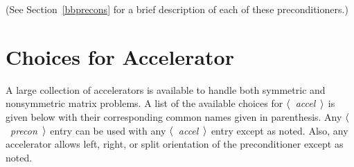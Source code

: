 \bigskip
\noindent
(See Section~\ref{bbprecons} for a brief description of each of
these preconditioners.)
\newpage
\section{Choices for Accelerator}
\label{accels}
\indent
 
   A large collection of accelerators is available to handle both
symmetric and nonsymmetric matrix problems.  A list of the
available choices for $\langle$~{\em accel}~$\rangle$ is given below
with their corresponding common names given in parenthesis.
Any $\langle$~{\em precon}~$\rangle$ entry can be used with any
$\langle$~{\em accel}~$\rangle$ entry except as noted.  Also, any
accelerator allows left, right, or split orientation of the
preconditioner except as noted.
     
